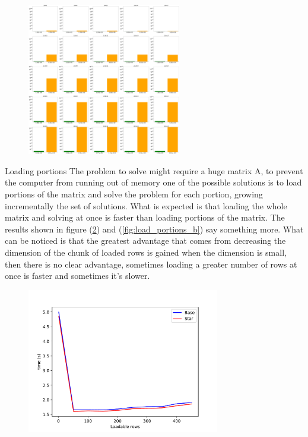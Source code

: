 \documentclass{beamer}
\begin{document}
\begin{frame}
    \begin{figure}
        \centering
        \includegraphics[width=0.6\textwidth]{explored_vs_explorable_5x5.pdf}
        \label{fig:explored_vs_explorable_5x5}
    \end{figure}
\end{frame}

\begin{frame}{Loading portions}
    The problem to solve might require a huge matrix A,
    to prevent the computer from running out of memory
    one of the possible solutions is to load portions of the matrix
    and solve the problem for each portion, growing incrementally
    the set of solutions.
    What is expected is that loading the whole matrix and solving
    at once is faster than loading portions of the matrix.
    The results shown in figure (\ref{fig:load_portions_a}) and 
    (\ref{fig:load_portions_b}) say something more.
    What can be noticed is that the greatest advantage that comes
    from decreasing the dimension of the chunk of loaded rows is gained
    when the dimension is small, then there is no clear advantage,
    sometimes loading a greater number of rows at once is faster
    and sometimes it's slower.
\end{frame}

\begin{frame}
    \begin{figure}
        \centering
        \includegraphics[width=0.75\textwidth]{loadable_rows_time_diff.pdf}
        \label{fig:load_portions_a}
    \end{figure}
\end{frame}
\end{document}
